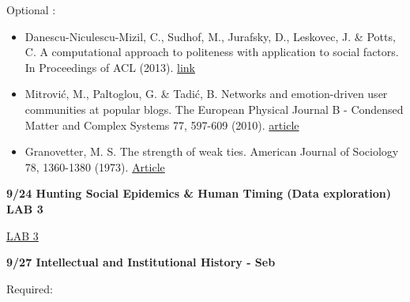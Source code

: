 Optional :

\begin{itemize}
\itemsep1pt\parskip0pt
\item
  Danescu-Niculescu-Mizil, C., Sudhof, M., Jurafsky, D., Leskovec, J. \&
  Potts, C. A computational approach to politeness with application to
  social factors. In Proceedings of ACL (2013).
  \href{http://www.mpi-sws.org/~cristian/Politeness.html}{link}
\item
  Mitrović, M., Paltoglou, G. \& Tadić, B. Networks and emotion-driven
  user communities at popular blogs. The European Physical Journal B -
  Condensed Matter and Complex Systems 77, 597-609 (2010).
  \href{http://link.springer.com/article/10.1140/epjb/e2010-00279-x}{article}
\item
  Granovetter, M. S. The strength of weak ties. American Journal of
  Sociology 78, 1360-1380 (1973).
  \href{http://sociology.stanford.edu/people/mgranovetter/documents/granstrengthweakties.pdf}{Article}
\end{itemize}

\textbf{9/24 Hunting Social Epidemics \& Human Timing (Data exploration)
LAB 3}

\href{http://courses.ischool.berkeley.edu/i290m-ocpp/site/article/lab3.html}{LAB
3}

\textbf{9/27 Intellectual and Institutional History - Seb}

Required:

